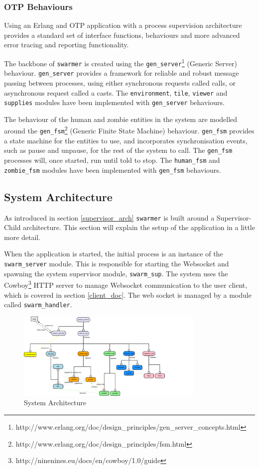\subsubsection{OTP Behaviours}
\label{otp_behaviours}
Using an Erlang and OTP application with a process supervision architecture provides a standard set of interface functions, behaviours and more advanced error tracing and reporting functionality.

The backbone of \verb+swarmer+ is created using the \verb+gen_server+\footnote{http://www.erlang.org/doc/design\_principles/gen\_server\_concepts.html} (Generic Server) behaviour. \verb+gen_server+ provides a framework for reliable and robust message passing between processes, using either synchronous requests called calls, or asynchronous request called a casts. The \verb+environment+, \verb+tile+, \verb+viewer+ and \verb+supplies+ modules have been implemented with \verb+gen_server+ behaviours.

The behaviour of the human and zombie entities in the system are modelled around the \verb+gen_fsm+\footnote{http://www.erlang.org/doc/design\_principles/fsm.html} (Generic Finite State Machine) behaviour. \verb+gen_fsm+ provides a state machine for the entities to use, and incorporates synchronisation events, such as pause and unpause, for the rest of the system to call. The \verb+gen_fsm+ processes will, once started, run until told to stop. The \verb+human_fsm+ and \verb+zombie_fsm+ modules have been implemented with \verb+gen_fsm+ behaviours.

\subsection{System Architecture}
\label{sys_overview_architecture}
As introduced in section \ref{supervisor_arch} \verb+swarmer+ is built around a Supervisor-Child architecture. This section will explain the setup of the application in a little more detail.

When the application is started, the initial process is an instance of the \verb+swarm_server+ module. This is responsible for starting the Websocket and spawning the system supervisor module, \verb+swarm_sup+. The system uses the Cowboy\footnote{http://ninenines.eu/docs/en/cowboy/1.0/guide} HTTP server to manage Websocket communication to the user client, which is covered in section \ref{client_doc}. The web socket is managed by a module called \verb+swarm_handler+.

\begin{figure}[h]
  \centering
  \includegraphics[width=0.8\textwidth]{img/final_system_ws.png}
\caption{System Architecture}
    \label{fig:system_ws}
\end{figure}

